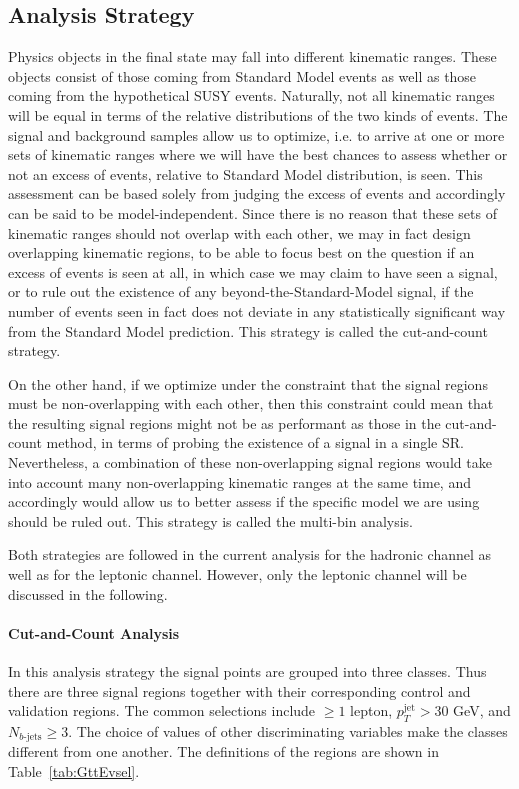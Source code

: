 \subsection{Analysis Strategy}\label{s:mbstra}

Physics objects in the final state may fall into different kinematic ranges.
These objects consist of those coming from Standard Model events as well as
those coming from the hypothetical SUSY events. Naturally, not all kinematic
ranges will be equal in terms of the relative distributions of the two kinds of
events. The signal and background samples allow us to optimize, i.e. to arrive
at one or more sets of kinematic ranges where we will have the best chances to
assess whether or not an excess of events, relative to Standard Model
distribution, is seen. This assessment can be based solely from judging the
excess of events and accordingly can be said to be model-independent. Since
there is no reason that these sets of kinematic ranges should not overlap with
each other, we may in fact design overlapping kinematic regions, to be able to
focus best on the question if an excess of events is seen at all, in which case
we may claim to have seen a signal, or to rule out the existence of any
beyond-the-Standard-Model signal, if the number of events seen in fact does not
deviate in any statistically significant way from the Standard Model
prediction. This strategy is called the cut-and-count strategy.

On the other hand, if we optimize under the constraint that the signal regions
must be non-overlapping with each other, then this constraint could mean that
the resulting signal regions might not be as performant as those in the
cut-and-count method, in terms of probing the existence of a signal in a single SR.
Nevertheless, a combination of these non-overlapping signal regions would take
into account many non-overlapping kinematic ranges at the same time, and
accordingly would allow us to better assess if the specific model we are using
should be ruled out. This strategy is called the multi-bin analysis.

Both strategies are followed in the current analysis for the hadronic channel
as well as for the leptonic channel. However, only the leptonic channel will be
discussed in the following.

\paragraph{Cut-and-Count Analysis} In this analysis strategy the signal points
are grouped into three classes. Thus there are three signal regions together
with their corresponding control and validation regions. The common selections
include $\geq 1$ lepton, $p_T^{\text{jet}} > 30$ GeV, and $N_{b\text{-jets}}
	\geq 3$. The choice of values of other discriminating variables make the
classes different from one another. The definitions of the regions are shown in
Table~\ref{tab:GttEvsel}.

